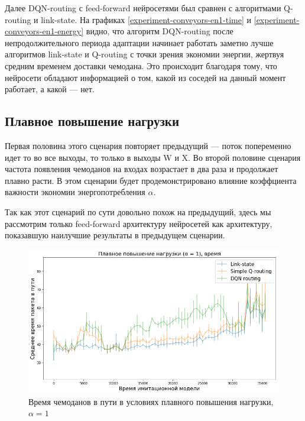 \documentclass[specification, annotation]{itmo-student-thesis}
\begin{document}
Далее DQN-routing с feed-forward нейросетями был сравнен с алгоритмами Q-routing
и link-state.
На графиках \ref{experiment-conveyors-en1-time} и
\ref{experiment-conveyors-en1-energy} видно, что алгоритм DQN-routing после
непродолжительного периода адаптации начинает работать заметно лучше алгоритмов
link-state и Q-routing с точки зрения экономии энергии, жертвуя средним временем
доставки чемодана. Это происходит благодаря тому, что нейросети обладают
информацией о том, какой из соседей на данный момент работает, а какой --- нет.

\subsection{Плавное повышение нагрузки}\label{experiments:conveyors/load}

Первая половина этого сценария повторяет предыдущий --- поток попеременно идет то
во все выходы, то только в выходы W и X. Во второй половине сценария частота
появления чемоданов на входах возрастает в два раза и продолжает плавно расти. В
этом сценарии будет продемонстрировано влияние коэффциента важности экономии
энергопотребления $\alpha$.

Так как этот сценарий по сути довольно похож на предыдущий, здесь мы рассмотрим
только feed-forward архитектуру нейросетей как архитектуру, показавшую наилучшие
результаты в предыдущем сценарии.

\begin{figure}[!h]
  \caption{Время чемоданов в пути в условиях плавного повышения нагрузки,
    $\alpha = 1$}\label{experiment-conveyors-a1-time}
  \centering
  \includegraphics[scale=0.6]{experiment-conveyors-a1-time}
\end{figure}
\end{document}
